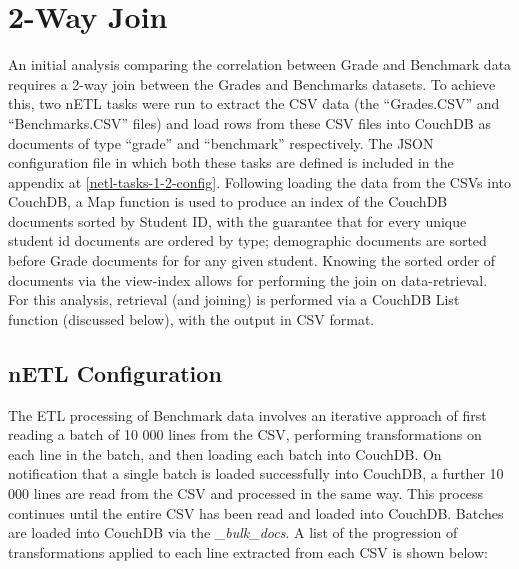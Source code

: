 \section{2-Way Join}
An initial analysis comparing the correlation between Grade and Benchmark data requires a 2-way join between the Grades and Benchmarks datasets. To achieve this, two nETL tasks were run to extract the CSV data (the ``Grades.CSV'' and ``Benchmarks.CSV'' files) and load rows from these CSV files into CouchDB as documents of type ``grade'' and ``benchmark'' respectively. The JSON configuration file in which both these tasks are defined is included in the appendix at \ref{netl-tasks-1-2-config}. Following loading the data from the CSVs into CouchDB, a Map function is used to produce an index of the CouchDB documents sorted by Student ID, with the guarantee that for every unique student id documents are ordered by type; demographic documents are sorted before Grade documents for for any given student. Knowing the sorted order of documents via the view-index allows for performing the join on data-retrieval. For this analysis, retrieval (and joining) is performed via a CouchDB List function (discussed below), with the output in CSV format.

\subsection{nETL Configuration}
The ETL processing of Benchmark data involves an iterative approach of first reading a batch of 10 000 lines from the CSV, performing transformations on each line in the batch, and then loading each batch into CouchDB. On notification that a single batch is loaded successfully into CouchDB, a further 10 000 lines are read from the CSV and processed in the same way. This process continues until the entire CSV has been read and loaded into CouchDB. Batches are loaded into CouchDB via the \textit{\_bulk\_docs}. A list of the progression of transformations applied to each line extracted from each CSV is shown below:

